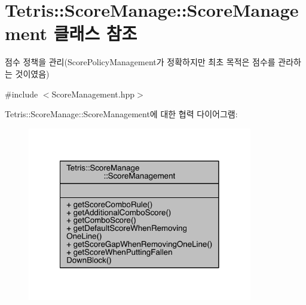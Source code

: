 \hypertarget{class_tetris_1_1_score_manage_1_1_score_management}{}\section{Tetris\+:\+:Score\+Manage\+:\+:Score\+Management 클래스 참조}
\label{class_tetris_1_1_score_manage_1_1_score_management}


점수 정책을 관리(Score\+Policy\+Management가 정확하지만 최초 목적은 점수를 관라하는 것이였음)  




{\ttfamily \#include $<$Score\+Management.\+hpp$>$}



Tetris\+:\+:Score\+Manage\+:\+:Score\+Management에 대한 협력 다이어그램\+:
\nopagebreak
\begin{figure}[H]
\begin{center}
\leavevmode
\includegraphics[width=278pt]{class_tetris_1_1_score_manage_1_1_score_management__coll__graph}
\end{center}
\end{figure}
